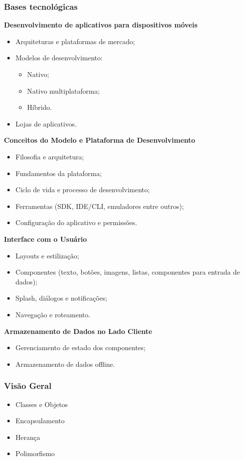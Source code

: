 \begin{frame}[allowframebreaks]
	\frametitle{Bases tecnológicas}
	
	\par \textbf{Desenvolvimento de aplicativos para dispositivos móveis}
	
	\begin{itemize}
		\item Arquiteturas e plataformas de mercado;
		\item Modelos de desenvolvimento:
		\begin{itemize}
			\item Nativo;
			\item Nativo multiplataforma;
			\item Híbrido.
		\end{itemize}
		\item Lojas de aplicativos.
	\end{itemize}
	
	\par \textbf{Conceitos do Modelo e Plataforma de Desenvolvimento}
	
	\begin{itemize}
		\item Filosofia e arquitetura;
		\item Fundamentos da plataforma;
		\item Ciclo de vida e processo de desenvolvimento;
		\item Ferramentas (SDK, IDE/CLI, emuladores entre outros);
		\item Configuração do aplicativo e permissões.
	\end{itemize}
	
	\par \textbf{Interface com o Usuário}
	
	\begin{itemize}
		\item Layouts e estilização;
		\item Componentes (texto, botões, imagens, listas, componentes para entrada de dados);
		\item Splash, diálogos e notificações;
		\item Navegação e roteamento.
	\end{itemize}
	
	\par \textbf{Armazenamento de Dados no Lado Cliente}
	
	\begin{itemize}
		\item Gerenciamento de estado dos componentes;
		\item Armazenamento de dados offline.
	\end{itemize}
\end{frame}

\begin{frame}
	\frametitle{Visão Geral}
	\begin{itemize}
		\item Classes e Objetos
		\item Encapsulamento
		\item Herança
		\item Polimorfismo
	\end{itemize}
\end{frame}